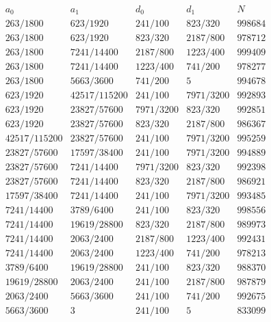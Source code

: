 \[
\begin{array}{c|c|c|c|r}
a_0&a_1&d_0&d_1&N\\ \hline
263/1800&623/1920&241/100&823/320&998684\\
263/1800&623/1920&823/320&2187/800&978712\\
263/1800&7241/14400&2187/800&1223/400&999409\\
263/1800&7241/14400&1223/400&741/200&978277\\
263/1800&5663/3600&741/200&5&994678\\
623/1920&42517/115200&241/100&7971/3200&992893\\
623/1920&23827/57600&7971/3200&823/320&992851\\
623/1920&23827/57600&823/320&2187/800&986367\\
42517/115200&23827/57600&241/100&7971/3200&995259\\
23827/57600&17597/38400&241/100&7971/3200&994889\\
23827/57600&7241/14400&7971/3200&823/320&992398\\
23827/57600&7241/14400&823/320&2187/800&986921\\
17597/38400&7241/14400&241/100&7971/3200&993485\\
7241/14400&3789/6400&241/100&823/320&998556\\
7241/14400&19619/28800&823/320&2187/800&989973\\
7241/14400&2063/2400&2187/800&1223/400&992431\\
7241/14400&2063/2400&1223/400&741/200&978213\\
3789/6400&19619/28800&241/100&823/320&988370\\
19619/28800&2063/2400&241/100&2187/800&987879\\
2063/2400&5663/3600&241/100&741/200&992675\\
5663/3600&3&241/100&5&833099
\end{array}
\]
